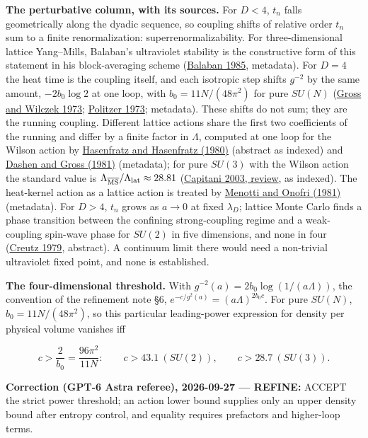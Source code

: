 \documentclass[11pt,a4paper]{article}
\begin{document}
\textbf{The perturbative column, with its sources.} For \(D<4\), \(t_n\)
falls geometrically along the dyadic sequence, so coupling shifts of
relative order \(t_n\) sum to a finite renormalization:
superrenormalizability. For three-dimensional lattice Yang--Mills,
Balaban's ultraviolet stability is the constructive form of this
statement in his block-averaging scheme
(\href{https://doi.org/10.1007/BF01229380}{Balaban 1985}, metadata). For
\(D=4\) the heat time is the coupling itself, and each isotropic step
shifts \(g^{-2}\) by the same amount, \(-2b_0\log2\) at one loop, with
\(b_0=11N/(48\pi^2)\) for pure \(SU(N)\)
(\href{https://doi.org/10.1103/PhysRevLett.30.1343}{Gross and Wilczek
1973}; \href{https://doi.org/10.1103/PhysRevLett.30.1346}{Politzer
1973}; metadata). These shifts do not sum; they are the running
coupling. Different lattice actions share the first two coefficients of
the running and differ by a finite factor in \(\Lambda\), computed at
one loop for the Wilson action by
\href{https://doi.org/10.1016/0370-2693(80)90118-5}{Hasenfratz and
Hasenfratz (1980)} (abstract as indexed) and
\href{https://doi.org/10.1103/PhysRevD.23.2340}{Dashen and Gross (1981)}
(metadata); for pure \(SU(3)\) with the Wilson action the standard value
is \(\Lambda_{\overline{\rm MS}}/\Lambda_{\rm lat}\approx28.81\)
(\href{https://doi.org/10.1016/S0370-1573(03)00211-4}{Capitani 2003,
review}, as indexed). The heat-kernel action as a lattice action is
treated by \href{https://doi.org/10.1016/0550-3213(81)90560-5}{Menotti
and Onofri (1981)} (metadata). For \(D>4\), \(t_n\) grows as \(a\to0\)
at fixed \(\lambda_D\); lattice Monte Carlo finds a phase transition
between the confining strong-coupling regime and a weak-coupling
spin-wave phase for \(SU(2)\) in five dimensions, and none in four
(\href{https://doi.org/10.1103/PhysRevLett.43.553}{Creutz 1979},
abstract). A continuum limit there would need a non-trivial ultraviolet
fixed point, and none is established.

\textbf{The four-dimensional threshold.} With
\(g^{-2}(a)=2b_0\log(1/(a\Lambda))\), the convention of the refinement
note §6, \(e^{-c/g^2(a)}=(a\Lambda)^{2b_0c}\). For pure \(SU(N)\),
\(b_0=11N/(48\pi^2)\), so this particular leading-power expression for
density per physical volume vanishes iff

\[c>\frac2{b_0}=\frac{96\pi^2}{11N}:\qquad c>43.1\ (SU(2)),\qquad
c>28.7\ (SU(3)).\]

\textbf{Correction (GPT-6 Astra referee), 2026-09-27 --- REFINE:} ACCEPT
the strict power threshold; an action lower bound supplies only an upper
density bound after entropy control, and equality requires prefactors
and higher-loop terms.
\end{document}
